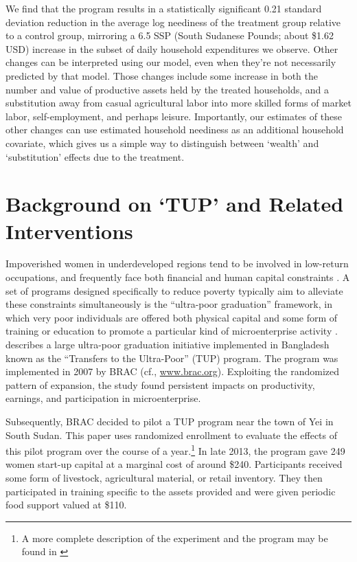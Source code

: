 \documentclass[12pt,letterpaper]{article}
\begin{document}
We find that the program results in a statistically significant 0.21
standard deviation reduction in the average log neediness of the
treatment group relative to a control group, mirroring a 6.5 SSP
(South Sudanese Pounds; about \$1.62 USD) increase in the subset 
of daily household expenditures we observe.  Other changes
can be interpreted using our model, even when they're not
necessarily predicted by that model.  Those changes include some
increase in both the number and value of productive assets held by
the treated households, and a substitution away from casual
agricultural labor into more skilled forms of market labor,
self-employment, and perhaps leisure.  Importantly, our estimates of
these other changes can use estimated household neediness as an
additional household covariate, which gives us a simple way to
distinguish between `wealth' and `substitution' effects due to the
treatment.

\section{Background on `TUP' and Related Interventions}
\label{sec:orgheadline5}

Impoverished women in underdeveloped regions tend to be involved in
low-return occupations, and frequently face both financial and human
capital constraints \citep{duflo2007}. A set of programs designed specifically
to reduce poverty typically aim to alleviate these constraints simultaneously is the ``ultra-poor graduation''
framework, in which very poor individuals are offered both physical
capital and some form of training or education to promote a particular
kind of microenterprise activity 
\citep[broad outcomes for similar programs are described in][]{banerjee-etal15}.  \cite{Bandiera-etal15} describes a
large ultra-poor graduation initiative implemented in Bangladesh known
as the ``Transfers to the Ultra-Poor'' (TUP) program. The program was
implemented in 2007 by BRAC (cf., \url{www.brac.org}). Exploiting
the randomized pattern of expansion, the study found persistent
impacts on productivity, earnings, and participation in
microenterprise.

Subsequently, BRAC decided to pilot a TUP program near the town of
Yei in South Sudan.  This paper uses randomized enrollment to evaluate the
effects of this pilot program over the course of a year.\footnote{A more complete description
of the experiment and the program may be found in
\cite{Chowdhury-etal15}} In late 2013, the program gave 249 women
start-up capital at a marginal cost of around \$240. Participants
received some form of livestock, agricultural material, or retail
inventory. They then participated in training specific to the
assets provided and were given periodic food support valued at \$110.
\end{document}
